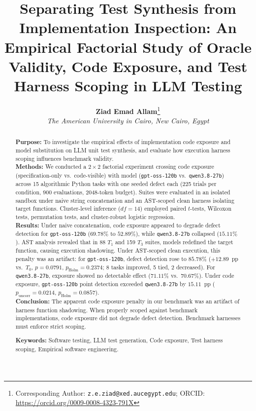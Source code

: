 \documentclass[11pt,a4paper]{article}
\title{\textbf{Separating Test Synthesis from Implementation Inspection: An Empirical Factorial Study of Oracle Validity, Code Exposure, and Test Harness Scoping in LLM Testing}}
\author{
    \textbf{Ziad Emad Allam}\thanks{Corresponding Author: \texttt{z.e.ziad@xed.aucegypt.edu}; ORCID: \url{https://orcid.org/0009-0008-4323-791X}} \\
    \textit{The American University in Cairo, New Cairo, Egypt}
}
\date{}
\begin{document}
\maketitle
\vspace{-1.2em}

\begin{abstract}
\noindent\textbf{Purpose:} To investigate the empirical effects of implementation code exposure and model substitution on LLM unit test synthesis, and evaluate how execution harness scoping influences benchmark validity. \\
\textbf{Methods:} We conducted a $2 \times 2$ factorial experiment crossing code exposure (specification-only vs.\ code-visible) with model (\texttt{gpt-oss-120b} vs.\ \texttt{qwen3.8-27b}) across 15 algorithmic Python tasks with one seeded defect each (225 trials per condition, 900 evaluations, 2048-token budget). Suites were evaluated in an isolated sandbox under naive string concatenation and an AST-scoped clean harness isolating target functions. Cluster-level inference ($df=14$) employed paired $t$-tests, Wilcoxon tests, permutation tests, and cluster-robust logistic regression. \\
\textbf{Results:} Under naive concatenation, code exposure appeared to degrade defect detection for \texttt{gpt-oss-120b} ($69.78\%$ to $52.89\%$), while \texttt{qwen3.8-27b} collapsed ($15.11\%$). AST analysis revealed that in 88 $T_1$ and 159 $T_3$ suites, models redefined the target function, causing execution shadowing. Under AST-scoped clean execution, this penalty was an artifact: for \texttt{gpt-oss-120b}, defect detection rose to $85.78\%$ ($+12.89$~pp vs.\ $T_0$, $p=0.0791$, $p_{\text{Holm}}=0.2374$; 8 tasks improved, 5 tied, 2 decreased). For \texttt{qwen3.8-27b}, exposure showed no detectable effect ($71.11\%$ vs.\ $70.67\%$). Under code exposure, \texttt{gpt-oss-120b} point detection exceeded \texttt{qwen3.8-27b} by $15.11$~pp ($p_{\text{uncorr}}=0.0214$, $p_{\text{Holm}}=0.0857$). \\
\textbf{Conclusion:} The apparent code exposure penalty in our benchmark was an artifact of harness function shadowing. When properly scoped against benchmark implementations, code exposure did not degrade defect detection. Benchmark harnesses must enforce strict scoping.

\vspace{0.4em}
\noindent\textbf{Keywords:} Software testing, LLM test generation, Code exposure, Test harness scoping, Empirical software engineering.
\end{abstract}
\end{document}
